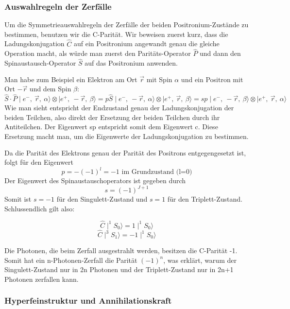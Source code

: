 \subsubsection{Auswahlregeln der Zerfälle \label{4}}

Um die Symmetrieauswahlregeln der Zerfälle der beiden Positronium-Zustände zu bestimmen, benutzen wir die C-Parität. Wir beweisen zuerst kurz, dass die Ladungskonjugation $\hat C$ auf ein Positronium angewandt genau die gleiche Operation macht, als würde man zuerst den Paritäts-Operator $\hat P$ und dann den Spinaustausch-Operator $\hat S$ auf das Positronium anwenden.

Man habe zum Beispiel ein Elektron am Ort $\vec r$ mit Spin $\alpha$ und ein Positron mit Ort $-\vec r$ und dem Spin $\beta$:
$$\hat S\cdot\hat P\mid e^-,\ \vec r,\ \alpha \rangle \otimes \mid e^+,\ -\vec r,\ \beta \rangle
 = p\hat S\mid e^-,\ -\vec r,\ \alpha \rangle \otimes \mid e^+,\ \vec r,\ \beta \rangle 
 = sp\mid e^-,\ -\vec r,\ \beta \rangle \otimes \mid e^+,\ \vec r,\ \alpha \rangle $$
Wie man sieht entspricht der Endzustand genau der Ladungskonjugation der beiden Teilchen, also direkt der Ersetzung der beiden Teilchen durch ihr Antiteilchen. Der Eigenwert sp entspricht somit dem Eigenwert c. Diese Ersetzung macht man, um die Eigenwerte der Ladungskonjugation zu bestimmen.

Da die Parität des Elektrons genau der Parität des Positrons entgegengesetzt ist, folgt für den Eigenwert
$$p = -(-1)^l = -1 \text{\ \ im Grundzustand (l=0)}$$
Der Eigenwert des Spinaustauschoperators ist gegeben durch $$s=(-1)^{J+1}$$
Somit ist $s=-1$ für den Singulett-Zustand und $s=1$ für den Triplett-Zustand.
Schlussendlich gilt also:

\begin{equation} \hat C \mid ^1S_0 \rangle = 1 \mid ^1S_0 \rangle \end{equation}
\begin{equation} \hat C \mid ^3S_1 \rangle = -1 \mid ^1S_0 \rangle \end{equation}

Die Photonen, die beim Zerfall ausgestrahlt werden, besitzen die C-Parität -1. Somit hat ein n-Photonen-Zerfall die Parität $(-1)^n$, was erklärt, warum der Singulett-Zustand nur in 2n Photonen und der Triplett-Zustand nur in 2n+1 Photonen zerfallen kann.

\subsubsection{Hyperfeinstruktur und Annihilationskraft}

